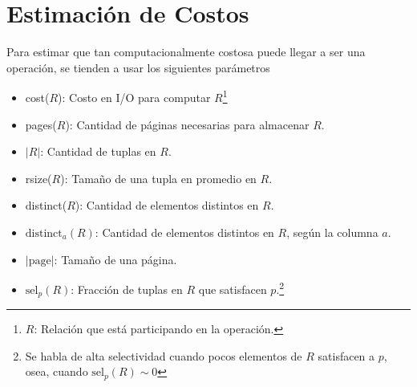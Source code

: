 \section{Estimación de Costos}
Para estimar que tan computacionalmente costosa puede llegar a ser una operación, se tienden a usar los siguientes parámetros
\begin{itemize}
  \item cost($R$): Costo en I/O para computar $R$\footnote{$R$: Relación que está participando en la operación.}
  \item pages($R$): Cantidad de páginas necesarias para almacenar $R$.
  \item $|R|$: Cantidad de tuplas en $R$.
  \item rsize($R$): Tamaño de una tupla en promedio en $R$.
  \item distinct($R$): Cantidad de elementos distintos en $R$.
  \item $\text{distinct}_a(R)$: Cantidad de elementos distintos en $R$, según la columna $a$.
  \item $|\text{page}|$: Tamaño de una página.
  \item $\text{sel}_p(R)$: Fracción de tuplas en $R$ que satisfacen $p$.\footnote{Se habla de alta selectividad cuando pocos elementos de $R$ satisfacen a $p$, osea, cuando $\text{sel}_p(R) \sim 0$}
\end{itemize}
